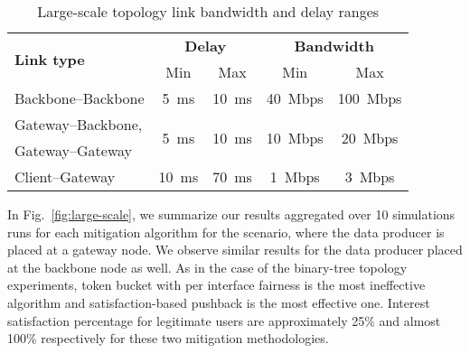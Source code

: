 \begin{table}[htbp]
\centering
\caption{Large-scale topology link bandwidth and delay ranges}
\label{tab:large-scale}
\begin{tabular}{|l||c|c||c|c|}
  \hline
  \multirow{2}{*}{\bf Link type} &  \multicolumn{2}{|c||}{\bf Delay} &  \multicolumn{2}{|c|}{\bf Bandwidth} \tabularnewline
  \cline{2-5}
                        &  Min & Max                       &  Min & Max \tabularnewline
  \hline \hline
  Backbone--Backbone    & 5~ms & 10~ms   & 40~Mbps & 100~Mbps \tabularnewline
  \hline
  Gateway--Backbone,    & \multirow{2}{*}{5~ms} & \multirow{2}{*}{10~ms}   
                        & \multirow{2}{*}{10~Mbps} & \multirow{2}{*}{20~Mbps} \tabularnewline
  Gateway--Gateway      & & & & \\
  \hline
  Client--Gateway       & 10~ms & 70~ms   & 1~Mbps  & 3~Mbps \\
  \hline

\end{tabular}
\end{table}




In Fig.~\ref{fig:large-scale}, we summarize our results aggregated over 10 simulations runs for each mitigation algorithm for the scenario, where the data producer is placed at a gateway node. We observe similar results for the data producer placed at the backbone node as well. As in the case of the binary-tree topology experiments, token bucket with per interface fairness is the most ineffective algorithm and satisfaction-based pushback is the most effective one.   Interest satisfaction percentage for legitimate users are approximately 25\% and almost 100\% respectively for these two mitigation methodologies.

